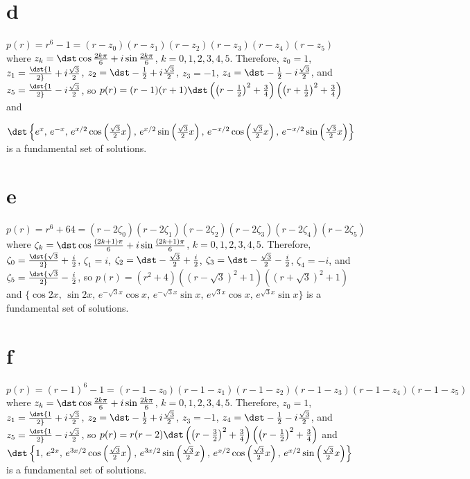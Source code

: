 \documentclass[dvips]{book}
\numberwithin{example}{section}
\numberwithin{equation}{section}
\numberwithin{theorem}{section}
\numberwithin{table}{section}
\numberwithin{figure}{section}
\begin{document}
\part{d}
$p(r)=r^6-1=(r-z_0)(r-z_1)(r-z_2)(r-z_3)(r-z_4)(r-z_5)$ where
$z_k=\dst\cos{2k\pi\over6}+i\sin{2k\pi\over6}$,
$k=0,1,2,3,4,5$. Therefore,
$z_0=1$,
$z_1=\dst{1\over2}+i{\sqrt3\over2}$,
$z_2=\dst-{1\over2}+i{\sqrt3\over2}$,
$z_3=-1$,
$z_4=\dst-{1\over2}-i{\sqrt3\over2}$,
and $z_5=\dst{1\over2}-i{\sqrt3\over2}$, so
$p(r)=(r-1)(r+1)\dst\left(\left(r-{1\over2}\right)^2+{3\over4}\right)
\left(\left(r+{1\over2}\right)^2+{3\over4}\right)$ and

 $\dst\left\{e^x,\,e^{-x}
,\,e^{x/2}\cos\left({\sqrt3\over2}x\right),
\,e^{x/2}\sin\left({\sqrt3\over2}x\right),
\,e^{-x/2}\cos\left({\sqrt3\over2}x\right),
\,e^{-x/2}\sin\left({\sqrt3\over2}x\right)\right\}$
is a fundamental set of solutions.

\part{e}
$p(r)=r^6+64=(r-2\zeta_0)(r-2\zeta_1)(r-2\zeta_2)(r-2\zeta_3)
(r-2\zeta_4)(r-2\zeta_5)$ where
$\zeta_k=\dst\cos{(2k+1)\pi\over6}+i\sin{(2k+1)\pi\over6}$,
$k=0,1,2,3,4,5$. Therefore,
$\zeta_0=\dst{\sqrt3\over2}+{i\over2}$,
$\zeta_1=i$,
$\zeta_2=\dst-{\sqrt3\over2}+{i\over2}$,
$\zeta_3=\dst-{\sqrt3\over2}-{i\over2}$,
$\zeta_4=-i$, and
$\zeta_5=\dst{\sqrt3\over2}-{i\over2}$,  so
$p(r)=(r^2+4)((r-\sqrt3)^2+1)((r+\sqrt3)^2+1)$ and
 $\{\cos2x,\,\sin2x,\,e^{-\sqrt3x}\cos x,\,e^{-\sqrt3x}\sin x
,\,e^{\sqrt3x}\cos x,\,e^{\sqrt3x}\sin x\}$
is a fundamental set of solutions.

\part{f}
$p(r)=(r-1)^6-1=(r-1-z_0)(r-1-z_1)(r-1-z_2)(r-1-z_3)(r-1-z_4)(r-1-z_5)$
where
$z_k=\dst\cos{2k\pi\over6}+i\sin{2k\pi\over6}$,
$k=0,1,2,3,4,5$. Therefore,
$z_0=1$,
$z_1=\dst{1\over2}+i{\sqrt3\over2}$,
$z_2=\dst-{1\over2}+i{\sqrt3\over2}$,
$z_3=-1$,
$z_4=\dst-{1\over2}-i{\sqrt3\over2}$,
and $z_5=\dst{1\over2}-i{\sqrt3\over2}$, so
$p(r)=r(r-2)\dst\left(\left(r-{3\over2}\right)^2+{3\over4}\right)
\left(\left(r-{1\over2}\right)^2+{3\over4}\right)$ and
$\dst\left\{1,\,e^{2x}
,\,e^{3x/2}\cos\left({\sqrt3\over2}x\right),
\,e^{3x/2}\sin\left({\sqrt3\over2}x\right),
\,e^{x/2}\cos\left({\sqrt3\over2}x\right),
\,e^{x/2}\sin\left({\sqrt3\over2}x\right)\right\}$
is a fundamental set of solutions.
\end{document}
